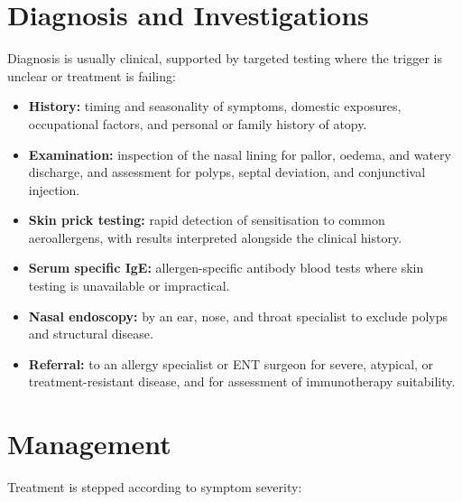 \section*{Diagnosis and Investigations}
Diagnosis is usually clinical, supported by targeted testing where the trigger is unclear or treatment is failing:

\begin{itemize}
    \item \textbf{History:} timing and seasonality of symptoms, domestic exposures, occupational factors, and personal or family history of atopy.
    \item \textbf{Examination:} inspection of the nasal lining for pallor, oedema, and watery discharge, and assessment for polyps, septal deviation, and conjunctival injection.
    \item \textbf{Skin prick testing:} rapid detection of sensitisation to common aeroallergens, with results interpreted alongside the clinical history.
    \item \textbf{Serum specific IgE:} allergen-specific antibody blood tests where skin testing is unavailable or impractical.
    \item \textbf{Nasal endoscopy:} by an ear, nose, and throat specialist to exclude polyps and structural disease.
    \item \textbf{Referral:} to an allergy specialist or ENT surgeon for severe, atypical, or treatment-resistant disease, and for assessment of immunotherapy suitability.
\end{itemize}

\section*{Management}
Treatment is stepped according to symptom severity:

